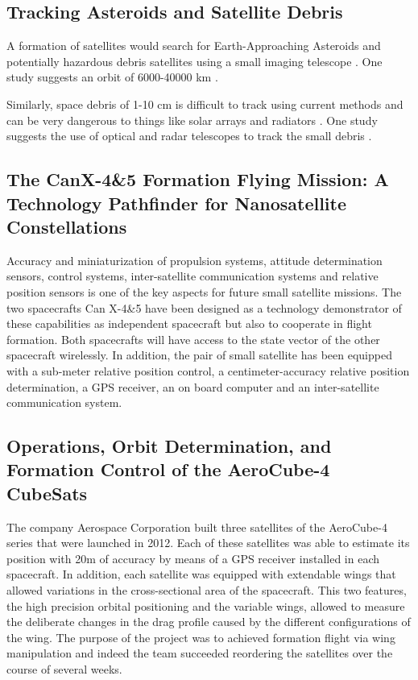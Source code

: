 \subsection{Tracking Asteroids and Satellite Debris }

A formation of satellites would search for Earth-Approaching Asteroids
and potentially hazardous debris satellites using a small imaging
telescope \cite{Ref:Carroll}. One study suggests an orbit of 6000-40000
km \cite{Ref:Leitch}. 

Similarly, space debris of 1-10 cm is difficult to track using current
methods and can be very dangerous to things like solar arrays and
radiators \cite{Ref:Guerrero}. One study suggests the use of optical
and radar telescopes to track the small debris \cite{Ref:Tolkachev}.

\subsection{The CanX-4\&5 Formation Flying Mission: A Technology Pathfinder for Nanosatellite Constellations}

Accuracy and miniaturization of propulsion systems, attitude determination
sensors, control systems, inter-satellite communication systems and
relative position sensors is one of the key aspects for future small
satellite missions. The two spacecrafts Can X-4\&5 have been designed
as a technology demonstrator of these capabilities as independent
spacecraft but also to cooperate in flight formation. Both spacecrafts
will have access to the state vector of the other spacecraft wirelessly.
In addition, the pair of small satellite has been equipped with a
sub-meter relative position control, a centimeter-accuracy relative
position determination, a GPS receiver, an on board computer and an
inter-satellite communication system.\cite{Bonin_FF_CanX-4&5}

\subsection{Operations, Orbit Determination, and Formation Control of the AeroCube-4 CubeSats}

The company Aerospace Corporation built three satellites of the AeroCube-4
series that were launched in 2012. Each of these satellites was able
to estimate its position with 20m of accuracy by means of a GPS receiver
installed in each spacecraft. In addition, each satellite was equipped
with extendable wings that allowed variations in the cross-sectional
area of the spacecraft. This two features, the high precision orbital
positioning and the variable wings, allowed to measure the deliberate
changes in the drag profile caused by the different configurations
of the wing. The purpose of the project was to achieved formation
flight via wing manipulation and indeed the team succeeded reordering
the satellites over the course of several weeks.\cite{Gangestad_FF_AeroForces}

